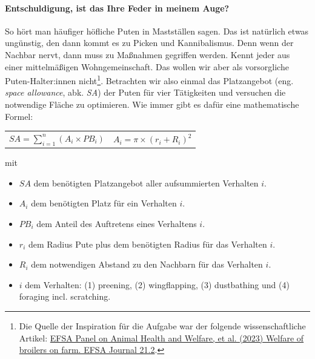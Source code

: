 \documentclass[a4paper, 9pt]{scrartcl}\usepackage[]{graphicx}\usepackage[]{xcolor}
\begin{document}
\paragraph{Entschuldigung,  ist das Ihre Feder in meinem Auge?}



So h{\"o}rt man h{\"a}ufiger h{\"o}fliche Puten in Mastst{\"a}llen sagen. Das
ist nat{\"u}rlich etwas ung{\"u}nstig, den dann kommt es zu Picken und
Kannibalismus. Denn wenn der Nachbar nervt, dann muss zu Ma{\ss}nahmen
gegriffen werden. Kennt jeder aus einer mittelm{\"a}{\ss}igen Wohngemeinschaft. Das
wollen wir aber als vorsorgliche Puten-Halter:innen
nicht\footnote{Die Quelle der Inspiration f{\"u}r die Aufgabe war der folgende
  wissenschaftliche Artikel:
  \href{https://www.efsa.europa.eu/en/efsajournal/pub/7788}{EFSA Panel on
    Animal Health and Welfare, et al. (2023) Welfare of broilers on
    farm. EFSA Journal 21.2}.}. Betrachten wir also einmal das Platzangebot
(eng. \textit{space allowance}, abk. \textit{SA}) der Puten
f{\"u}r vier T{\"a}tigkeiten und versuchen die notwendige Fl{\"a}che zu optimieren. Wie
immer gibt es daf{\"u}r eine mathematische Formel:


\begin{center}
  \begin{tabular}{cc}
    $SA = \sum^n_{i = 1} (A_i \times PB_i)$ & $A_i = \pi \times (r_i + R_i)^2$\\
  \end{tabular}
\end{center}

\vspace{-2Ex}

mit

\begin{itemize}[noitemsep]
\item $SA$ dem ben{\"o}tigten Platzangebot aller aufsummierten Verhalten $i$.
\item $A_i$ dem ben{\"o}tigten Platz f{\"u}r ein Verhalten $i$. 
\item $PB_i$ dem Anteil des Auftretens eines Verhaltens $i$.
\item $r_i$ dem Radius Pute plus dem ben{\"o}tigten Radius f{\"u}r das Verhalten $i$.
\item $R_i$ dem notwendigen Abstand zu den Nachbarn f{\"u}r das Verhalten $i$.    
\item $i$ dem Verhalten: (1) preening, (2) wingflapping, (3)
  dustbathing und (4) foraging incl. scratching.
\end{itemize}
\end{document}
